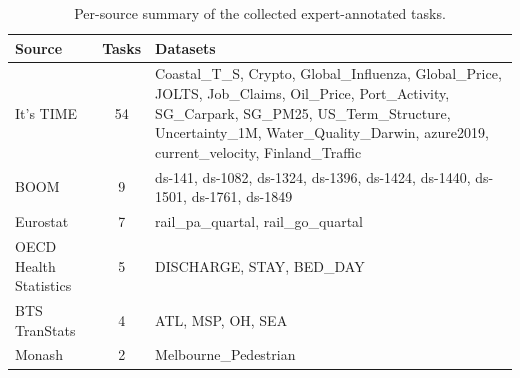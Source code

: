 \documentclass[]{servicenow}
\begin{document}
\begin{table}[t]
\centering
\footnotesize
\setlength{\tabcolsep}{5pt}
\renewcommand{\arraystretch}{1.12}
\caption{Per-source summary of the collected expert-annotated tasks.}
\label{tab:source-summary}
\begin{tabularx}{\linewidth}{@{}l c >{\raggedright\arraybackslash}X@{}}
\toprule
\textbf{Source} & \textbf{Tasks} & \textbf{Datasets} \\
\midrule
It's TIME~\citep{qiao2026s}
& 54
& Coastal\_T\_S, Crypto, Global\_Influenza, Global\_Price, JOLTS, Job\_Claims, Oil\_Price, Port\_Activity, SG\_Carpark, SG\_PM25, US\_Term\_Structure, Uncertainty\_1M, Water\_Quality\_Darwin, azure2019, current\_velocity, Finland\_Traffic \\

BOOM~\citep{cohen2025timedifferentobservabilityperspective}
& 9
& ds-141, ds-1082, ds-1324, ds-1396, ds-1424, ds-1440, ds-1501, ds-1761, ds-1849 \\

Eurostat
& 7
& rail\_pa\_quartal, rail\_go\_quartal \\

OECD Health Statistics
& 5
& DISCHARGE, STAY, BED\_DAY \\

BTS TranStats
& 4
& ATL, MSP, OH, SEA \\

Monash~\citep{godahewa2021monash}
& 2
& Melbourne\_Pedestrian \\
\bottomrule
\end{tabularx}
\end{table}
\end{document}
